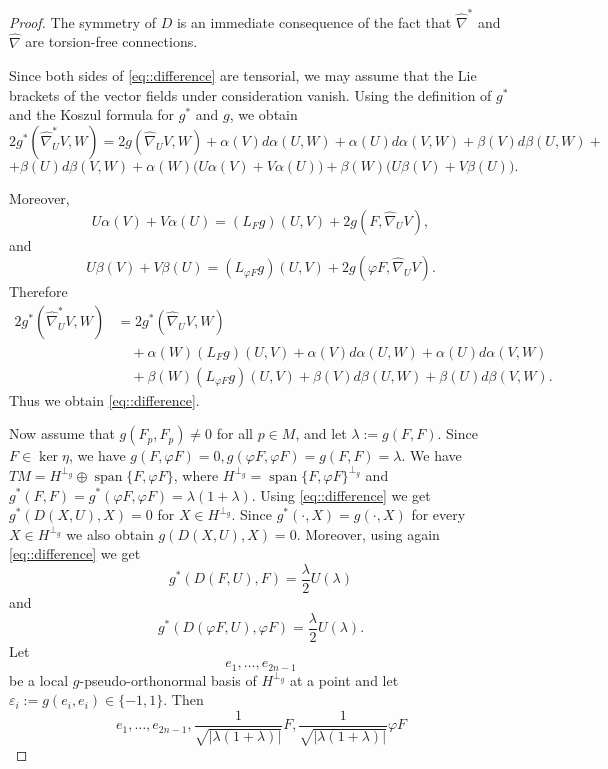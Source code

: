 \documentclass[12pt,a4paper,final]{amsart}
\numberwithin{equation}{section}
\theoremstyle{df}
\newcommand{\Span}{\operatorname{span}}
\newcommand{\eps}{\varepsilon}
\begin{document}
\begin{proof}
The symmetry of $D$ is an immediate consequence of the fact that $\widehat{\nabla}^\ast$ and $\widehat{\nabla}$ are torsion-free connections.
\par Since both sides of \eqref{eq::difference} are tensorial, we may assume that the
Lie brackets of the vector fields under consideration vanish. Using the definition of $g^\ast$ and the Koszul
formula for $g^\ast$ and $g$, we obtain
$$
2g^\ast(\widehat{\nabla}^\ast_UV,W)
=2g(\widehat{\nabla}_UV,W)
+\alpha(V)d\alpha(U,W)+\alpha(U)d\alpha(V,W)
+\beta(V)d\beta(U,W)+$$ $$ +\beta(U)d\beta(V,W)+\alpha(W)\bigl(U\alpha(V)+V\alpha(U)\bigr)
+\beta(W)\bigl(U\beta(V)+V\beta(U)\bigr).
$$

Moreover,
$$
U\alpha(V)+V\alpha(U)
=(L_Fg)(U,V)+2g(F,\widehat{\nabla}_UV),
$$
and
$$
U\beta(V)+V\beta(U)
=(L_{\varphi F}g)(U,V)+2g(\varphi F,\widehat{\nabla}_UV).
$$
Therefore
\begin{align*}
2g^\ast(\widehat{\nabla}^\ast_UV,W)
&=2g^\ast(\widehat{\nabla}_UV,W)\\
&\quad+\alpha(W)(L_Fg)(U,V)+\alpha(V)d\alpha(U,W)+\alpha(U)d\alpha(V,W)\\
&\quad+\beta(W)(L_{\varphi F}g)(U,V)
+\beta(V)d\beta(U,W)+\beta(U)d\beta(V,W).
\end{align*}
Thus we obtain \eqref{eq::difference}.
\par Now assume that $g(F_p,F_p)\neq 0$ for all $p\in M$, and let $\lambda:=g(F,F)$.
Since $F\in\ker\eta$, we have $g(F,\varphi F)=0, g(\varphi F,\varphi F)=g(F,F)=\lambda$.
We have $TM=H^{\perp_g}\oplus \Span\{F,\varphi F\}$, where $H^{\perp_g}=\Span\{F,\varphi F\}^{\perp_g}$ and $g^\ast(F,F)=g^\ast(\varphi F,\varphi F)=\lambda(1+\lambda)$.
Using  \eqref{eq::difference} we get $g^\ast(D(X,U),X)=0$ for $X\in H^{\perp_g}$.
Since $g^\ast(\cdot,X)=g(\cdot,X)$ for every $X\in H^{\perp_g}$ we also obtain $g(D(X,U),X)=0$.
Moreover, using again \eqref{eq::difference} we get
\begin{equation}\label{eq::DF}
g^\ast(D(F,U),F)=\frac{\lambda}{2}U(\lambda)
\end{equation}
and
\begin{equation}\label{eq::DphiF}
g^\ast(D(\varphi F,U),\varphi F)=\frac{\lambda}{2}U(\lambda).
\end{equation}
Let
$$
e_1,\dots,e_{2n-1}
$$
be a local $g$-pseudo-orthonormal basis of $H^{\perp_g}$ at a point and let $\eps_i:=g(e_i,e_i)\in\{-1,1\}$.
Then
$$
e_1,\dots,e_{2n-1},\frac{1}{\sqrt{|\lambda(1+\lambda)|}}F,\frac{1}{\sqrt{|\lambda(1+\lambda)|}}\varphi F
$$
\end{proof}
\end{document}

